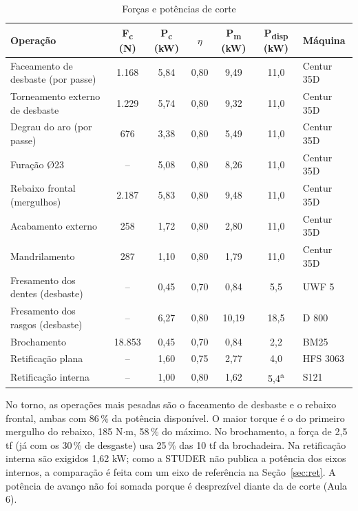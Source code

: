 \begin{table}[H]
\centering
\caption{Forças e potências de corte}\label{tab:pot}
{\small\renewcommand{\arraystretch}{1.2}
\begin{tabular}{|>{\raggedright\arraybackslash}p{5.2cm}|c|c|c|c|c|>{\raggedright\arraybackslash}p{1.9cm}|}
\hline
\rowcolor{cinza} \textbf{Operação} & \textbf{F\textsubscript{c} (N)} & \textbf{P\textsubscript{c} (kW)} & \textbf{$\eta$} & \textbf{P\textsubscript{m} (kW)} & \textbf{P\textsubscript{disp} (kW)} & \textbf{Máquina} \\ \hline
Faceamento de desbaste (por passe) & 1.168 & 5,84 & 0,80 & 9,49 & 11,0 & Centur 35D\\ \hline
Torneamento externo de desbaste & 1.229 & 5,74 & 0,80 & 9,32 & 11,0 & Centur 35D\\ \hline
Degrau do aro (por passe) & 676 & 3,38 & 0,80 & 5,49 & 11,0 & Centur 35D\\ \hline
Furação Ø23 & -- & 5,08 & 0,80 & 8,26 & 11,0 & Centur 35D\\ \hline
Rebaixo frontal (mergulhos) & 2.187 & 5,83 & 0,80 & 9,48 & 11,0 & Centur 35D\\ \hline
Acabamento externo & 258 & 1,72 & 0,80 & 2,80 & 11,0 & Centur 35D\\ \hline
Mandrilamento & 287 & 1,10 & 0,80 & 1,79 & 11,0 & Centur 35D\\ \hline
Fresamento dos dentes (desbaste) & -- & 0,45 & 0,70 & 0,84 & 5,5 & UWF 5 \\ \hline
Fresamento dos rasgos (desbaste) & -- & 6,27 & 0,80 & 10,19 & 18,5 & D 800 \\ \hline
Brochamento & 18.853 & 0,45 & 0,70 & 0,84 & 2,2 & BM25\\ \hline
Retificação plana & -- & 1,60 & 0,75 & 2,77 & 4,0 & HFS 3063 \\ \hline
Retificação interna & -- & 1,00 & 0,80 & 1,62 & 5,4\textsuperscript{a} & S121 \\ \hline
\end{tabular}}
\end{table}

No torno, as operações mais pesadas são o faceamento de desbaste e o rebaixo frontal, ambas com 86\,\% da potência disponível. O maior torque é o do primeiro mergulho do rebaixo, 185 N$\cdot$m, 58\,\% do máximo. No brochamento, a força de 2,5 tf (já com os 30\,\% de desgaste) usa 25\,\% das 10 tf da brochadeira. Na retificação interna são exigidos 1,62 kW; como a STUDER não publica a potência dos eixos internos, a comparação é feita com um eixo de referência na Seção~\ref{sec:ret}. A potência de avanço não foi somada porque é desprezível diante da de corte (Aula 6).
